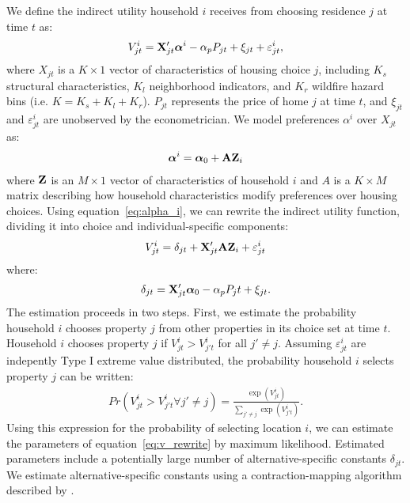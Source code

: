\documentclass[10pt]{article}
\begin{document}
We define the indirect utility household $i$ receives from choosing residence $j$ at time $t$ as:
\begin{align}
V^i_{jt} = {\bf X}'_{jt}{\boldsymbol \alpha}^i  - \alpha_p P_{jt} + \xi_{jt} + \varepsilon^i_{jt},
\end{align}
where $X_{jt}$ is a $K\times 1$ vector of characteristics of housing choice $j$, including $K_s$ structural characteristics, $K_l$ neighborhood indicators, and $K_r$ wildfire hazard bins (i.e. $K = K_s + K_l + K_r$). $P_{jt}$ represents the price of home $j$ at time $t$, and $\xi_{jt}$ and $\varepsilon^i_{jt}$ are unobserved by the econometrician. We model preferences $\alpha^i$ over $X_{jt}$ as:
\begin{align} \label{eq:alpha_i}
{\boldsymbol \alpha}^i = {\boldsymbol \alpha}_{0} + {\bf A}{\bf Z}_i 
\end{align}
where ${\bf Z}$ is an $M\times 1 $ vector of characteristics of household $i$ and $A$ is a $K\times M$ matrix describing how household characteristics modify preferences over housing choices. Using equation~\ref{eq:alpha_i}, we can rewrite the indirect utility function, dividing it into choice and individual-specific components:
\begin{align} \label{eq:v_rewrite}
V^i_{jt} =  \delta_{jt} + {\bf X}'_{jt}{\bf A}{\bf Z}_i + \varepsilon^i_{jt}
\end{align}
where: 
\begin{align} \label{eq:delta}
\delta_{jt} = {\bf X}'_{jt}{\boldsymbol \alpha}_{0}  - \alpha_p P_jt + \xi_{jt}.
\end{align}
The estimation proceeds in two steps. First, we estimate the probability household $i$ chooses property $j$ from other properties in its choice set at time $t$. Household $i$ chooses property $j$ if $V^i_{jt} > V^i_{j't}$ for all $j' \neq j$. Assuming $\varepsilon^i_{jt}$ are indepently Type I extreme value distributed, the probability household $i$ selects property $j$ can be written:
\begin{align} \label{eq:prob_vi}
Pr(V^i_{jt} > V^i_{j't} \forall j' \neq j) = \frac{\exp(V^i_{jt})}{\sum_{j' \neq j} \exp(V^i_{j't})}.
\end{align}
Using this expression for the probability of selecting location $i$, we can estimate the parameters of equation~\ref{eq:v_rewrite} by maximum likelihood. Estimated parameters include a potentially large number of alternative-specific constants $\delta_{jt}$.
We estimate alternative-specific constants using a contraction-mapping algorithm described by \citep{blp1995}. 
\end{document}
